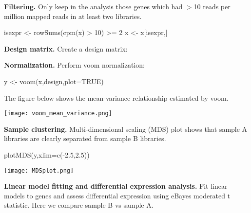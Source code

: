 \documentclass[12pt]{report}
\newcommand{\voom}{\textsf{voom}}
\begin{document}
%


{\noindent\bf Filtering.} Only keep in the analysis those genes which had $>$10 reads per million mapped reads in at least two libraries.

\begin{Rcode}
isexpr <- rowSums(cpm(x) > 10) >= 2
x <- x[isexpr,]
\end{Rcode}

{\noindent\bf Design matrix.} Create a design matrix: 


{\noindent\bf Normalization.} Perform {\voom} normalization: 

\begin{Rcode}
y <- voom(x,design,plot=TRUE)
\end{Rcode}

The figure below shows the mean-variance relationship estimated by voom.
\begin{center}
\texttt{[image: voom\_mean\_variance.png]}
\end{center}

{\noindent\bf Sample clustering.} Multi-dimensional scaling (MDS) plot shows that sample A libraries are clearly separated from sample B libraries.

\begin{Rcode}
plotMDS(y,xlim=c(-2.5,2.5))
\end{Rcode}

\begin{center}
\texttt{[image: MDSplot.png]}
\end{center}

{\noindent\bf Linear model fitting and differential expression analysis.} Fit linear models to genes and assess differential expression using eBayes moderated t statistic.
Here we compare sample B vs sample A.
\end{document}

